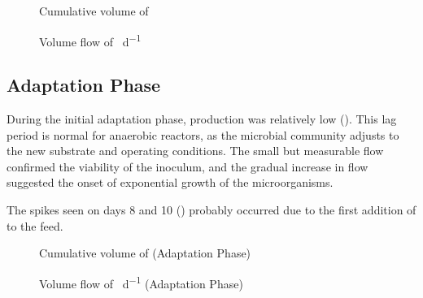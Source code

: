\begin{figure}[H]
    \centering
    \caption{Cumulative volume of  \unit{\nml}}
    \label{graph:total-accumulation}
\end{figure}

\begin{figure}[H]
    \centering
    \caption{Volume flow of  \unit{\nml\per\day}}
    \label{graph:total-flow}
\end{figure}

\subsection{Adaptation Phase}
\label{subsec:adaptation_phase}

During the initial adaptation phase,  production was relatively low (). This lag period is normal for anaerobic reactors, as the microbial community adjusts to the new substrate and operating conditions. The small but measurable  flow confirmed the viability of the inoculum, and the gradual increase in flow suggested the onset of exponential growth of the microorganisms.

The spikes seen on days \num{8} and \num{10} () probably occurred due to the first addition of  to the feed.

\begin{figure}[H]
    \centering
    \caption{Cumulative volume of  \unit{\nml} (Adaptation Phase)}
    \label{graph:pre-accumulation}
\end{figure}

\begin{figure}[H]
    \centering
    \caption{Volume flow of  \unit{\nml\per\day} (Adaptation Phase)}
    \label{graph:pre-flow}
\end{figure}

